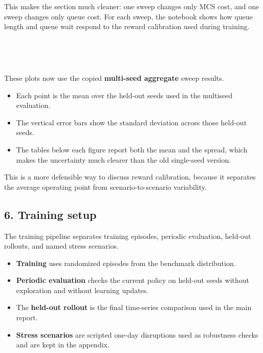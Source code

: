 \documentclass[11pt]{article}
\providecommand{\tightlist}{%
      \setlength{\itemsep}{0pt}\setlength{\parskip}{0pt}}
\begin{document}
This makes the section much cleaner: one sweep changes only MCS cost,
and one sweep changes only queue cost. For each sweep, the notebook
shows how queue length and queue wait respond to the reward calibration
used during training.

    \begin{center}
    \end{center}
    { \hspace*{\fill} \\}
    
    \begin{center}
    \end{center}
    { \hspace*{\fill} \\}
    
    These plots now use the copied \textbf{multi-seed aggregate} sweep
results.

\begin{itemize}
\tightlist
\item
  Each point is the mean over the held-out seeds used in the multiseed
  evaluation.
\item
  The vertical error bars show the standard deviation across those
  held-out seeds.
\item
  The tables below each figure report both the mean and the spread,
  which makes the uncertainty much clearer than the old single-seed
  version.
\end{itemize}

This is a more defensible way to discuss reward calibration, because it
separates the average operating point from scenario-to-scenario
variability.

    \subsection{6. Training setup}\label{training-setup}

The training pipeline separates training episodes, periodic evaluation,
held-out rollouts, and named stress scenarios.

\begin{itemize}
\tightlist
\item
  \textbf{Training} uses randomized episodes from the benchmark
  distribution.
\item
  \textbf{Periodic evaluation} checks the current policy on held-out
  seeds without exploration and without learning updates.
\item
  The \textbf{held-out rollout} is the final time-series comparison used
  in the main report.
\item
  \textbf{Stress scenarios} are scripted one-day disruptions used as
  robustness checks and are kept in the appendix.
\end{itemize}
\end{document}
